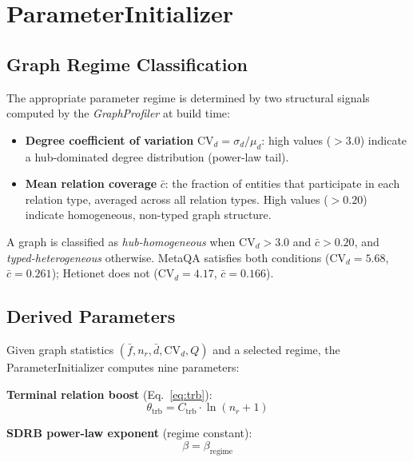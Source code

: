 \documentclass[11pt,a4paper]{article}
\begin{document}
\section{ParameterInitializer}
\label{sec:pi}

\subsection{Graph Regime Classification}

The appropriate parameter regime is determined by two structural signals
computed by the \emph{GraphProfiler} at build time:

\begin{itemize}
  \item \textbf{Degree coefficient of variation} $\text{CV}_d = \sigma_d / \mu_d$:
    high values ($> 3.0$) indicate a hub-dominated degree distribution
    (power-law tail).
  \item \textbf{Mean relation coverage} $\bar{c}$: the fraction of entities
    that participate in each relation type, averaged across all relation types.
    High values ($> 0.20$) indicate homogeneous, non-typed graph structure.
\end{itemize}

\noindent A graph is classified as \textit{hub-homogeneous} when
$\text{CV}_d > 3.0$ and $\bar{c} > 0.20$, and \textit{typed-heterogeneous}
otherwise. MetaQA satisfies both conditions ($\text{CV}_d = 5.68$,
$\bar{c} = 0.261$); Hetionet does not ($\text{CV}_d = 4.17$, $\bar{c} = 0.166$).

\subsection{Derived Parameters}

Given graph statistics $(\bar{f}, n_r, \bar{d}, \text{CV}_d, Q)$ and a
selected regime, the ParameterInitializer computes nine parameters:

\vspace{0.5em}
\noindent\textbf{Terminal relation boost} (Eq.~\ref{eq:trb}):
\begin{equation}
  \theta_{\text{trb}} = C_{\text{trb}} \cdot \ln(n_r + 1)
\end{equation}

\noindent\textbf{SDRB power-law exponent} (regime constant):
\begin{equation}
  \beta = \beta_{\text{regime}}
\end{equation}
\end{document}
